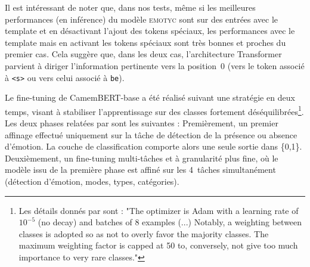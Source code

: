 \documentclass[french, 11pt]{article}
\begin{document}
Il est intéressant de noter que, dans nos tests, même si les meilleures performances (en inférence) du modèle \textsc{emotyc} sont sur des entrées avec le template et en désactivant l'ajout des tokens spéciaux, les performances avec le template mais en activant les tokens spéciaux sont très bonnes et proches du premier cas. Cela suggère que, dans les deux cas, l'architecture Transformer parvient à diriger l'information pertinente vers la position~0 (vers le token associé à \texttt{<s>} ou vers celui associé à \texttt{be}).


Le fine-tuning de CamemBERT-base a été réalisé suivant une stratégie en deux temps, visant à stabiliser l'apprentissage sur des classes fortement déséquilibrées\footnote{Les détails donnés par \textcite[p.5]{etienne2024} sont : "The optimizer is Adam with a learning rate of $10^{-5}$ (no decay) and batches of 8 examples (...) Notably, a weighting between classes is adopted so as not to overly favor the majority classes. The maximum weighting factor is capped at 50 to, conversely, not give too much importance to very rare classes."}. Les deux phases relatées par \textcite{etienne2024} sont les suivantes : Premièrement, un premier affinage effectué uniquement sur la tâche de détection de la présence ou absence d'émotion. La couche de classification comporte alors une seule sortie dans \{0,1\}. Deuxièmement, un fine-tuning multi-tâches et à granularité plus fine, où le modèle issu de la première phase est  affiné sur les 4~tâches simultanément (détection d'émotion, modes, types, catégories).
\end{document}

